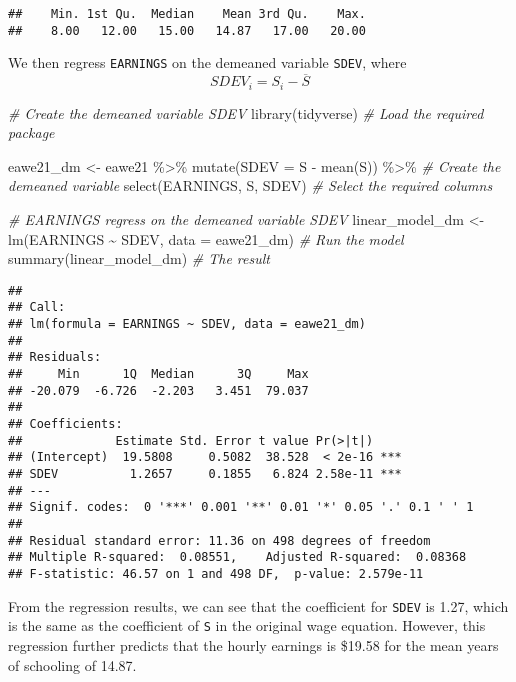 \documentclass[
]{article}
\newenvironment{Shaded}{\begin{snugshade}}{\end{snugshade}}
\newcommand{\AttributeTok}[1]{\textcolor[rgb]{0.77,0.63,0.00}{#1}}
\newcommand{\CommentTok}[1]{\textcolor[rgb]{0.56,0.35,0.01}{\textit{#1}}}
\newcommand{\FunctionTok}[1]{\textcolor[rgb]{0.00,0.00,0.00}{#1}}
\newcommand{\NormalTok}[1]{#1}
\newcommand{\OtherTok}[1]{\textcolor[rgb]{0.56,0.35,0.01}{#1}}
\newcommand{\SpecialCharTok}[1]{\textcolor[rgb]{0.00,0.00,0.00}{#1}}
\begin{document}
\begin{verbatim}
##    Min. 1st Qu.  Median    Mean 3rd Qu.    Max. 
##    8.00   12.00   15.00   14.87   17.00   20.00
\end{verbatim}

We then regress \texttt{EARNINGS} on the demeaned variable
\texttt{SDEV}, where \[SDEV_i=S_i-\overline{S}\]

\begin{Shaded}
\begin{Highlighting}[]
\CommentTok{\# Create the demeaned variable SDEV}
\FunctionTok{library}\NormalTok{(tidyverse)                  }\CommentTok{\# Load the required package}

\NormalTok{eawe21\_dm }\OtherTok{\textless{}{-}}\NormalTok{ eawe21 }\SpecialCharTok{\%\textgreater{}\%}
  \FunctionTok{mutate}\NormalTok{(}\AttributeTok{SDEV =}\NormalTok{ S }\SpecialCharTok{{-}} \FunctionTok{mean}\NormalTok{(S)) }\SpecialCharTok{\%\textgreater{}\%}    \CommentTok{\# Create the demeaned variable}
  \FunctionTok{select}\NormalTok{(EARNINGS, S, SDEV)         }\CommentTok{\# Select the required columns}

\CommentTok{\# EARNINGS regress on the demeaned variable SDEV}
\NormalTok{linear\_model\_dm }\OtherTok{\textless{}{-}} \FunctionTok{lm}\NormalTok{(EARNINGS }\SpecialCharTok{\textasciitilde{}}\NormalTok{ SDEV, }\AttributeTok{data =}\NormalTok{ eawe21\_dm)     }\CommentTok{\# Run the model}
\FunctionTok{summary}\NormalTok{(linear\_model\_dm)                                     }\CommentTok{\# The result      }
\end{Highlighting}
\end{Shaded}

\begin{verbatim}
## 
## Call:
## lm(formula = EARNINGS ~ SDEV, data = eawe21_dm)
## 
## Residuals:
##     Min      1Q  Median      3Q     Max 
## -20.079  -6.726  -2.203   3.451  79.037 
## 
## Coefficients:
##             Estimate Std. Error t value Pr(>|t|)    
## (Intercept)  19.5808     0.5082  38.528  < 2e-16 ***
## SDEV          1.2657     0.1855   6.824 2.58e-11 ***
## ---
## Signif. codes:  0 '***' 0.001 '**' 0.01 '*' 0.05 '.' 0.1 ' ' 1
## 
## Residual standard error: 11.36 on 498 degrees of freedom
## Multiple R-squared:  0.08551,    Adjusted R-squared:  0.08368 
## F-statistic: 46.57 on 1 and 498 DF,  p-value: 2.579e-11
\end{verbatim}

From the regression results, we can see that the coefficient for
\texttt{SDEV} is 1.27, which is the same as the coefficient of
\texttt{S} in the original wage equation. However, this regression
further predicts that the hourly earnings is \$19.58 for the mean years
of schooling of 14.87.
\end{document}
